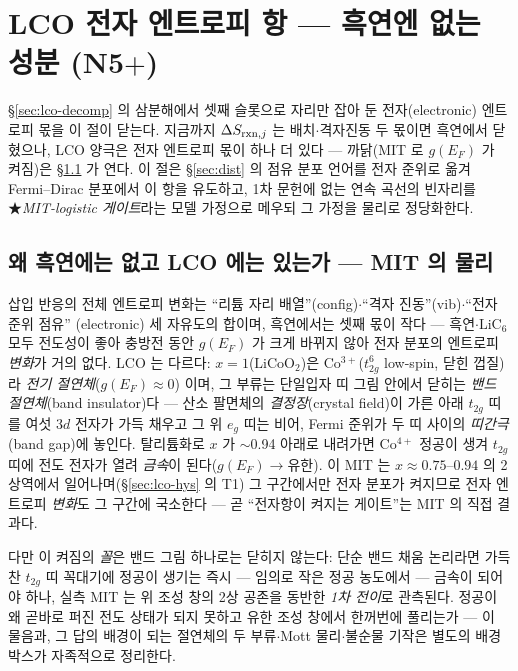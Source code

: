 \section{LCO 전자 엔트로피 항 --- 흑연엔 없는 성분 (N5$+$)}\label{sec:lco-electronic}
\S\ref{sec:lco-decomp} 의 삼분해에서 셋째 슬롯으로 자리만 잡아 둔 전자(electronic) 엔트로피 몫을 이 절이 닫는다.
지금까지 $\Delta S_{\mathrm{rxn},j}$ 는 배치$\cdot$격자진동 두 몫이면 흑연에서 닫혔으나, LCO 양극은 전자 엔트로피
몫이 하나 더 있다 --- 까닭(MIT 로 $g(E_F)$ 가 켜짐)은 \S\ref{sec:lco-why} 가 연다.
이 절은 \S\ref{sec:dist} 의 점유 분포 언어를 전자 준위로 옮겨 Fermi--Dirac 분포에서 이 항을 유도하고,
1차 문헌에 없는 연속 곡선의 빈자리를 ★\emph{MIT-logistic 게이트}라는 모델 가정으로 메우되 그 가정을 물리로
정당화한다.

\subsection{왜 흑연에는 없고 LCO 에는 있는가 --- MIT 의 물리}\label{sec:lco-why}
삽입 반응의 전체 엔트로피 변화는 ``리튬 자리 배열''(config)$\cdot$``격자 진동''(vib)$\cdot$``전자 준위 점유''
(electronic) 세 자유도의 합이며, 흑연에서는 셋째 몫이 작다 --- 흑연$\cdot$$\mathrm{LiC_6}$ 모두 전도성이 좋아
충방전 동안 $g(E_F)$ 가 크게 바뀌지 않아 전자 분포의 엔트로피 \emph{변화}가 거의 없다. LCO 는 다르다:
$x{=}1$($\mathrm{LiCoO_2}$)은 Co$^{3+}$($t_{2g}^6$ low-spin, 닫힌 껍질)라 \emph{전기 절연체}($g(E_F)\!\approx\!0$)
이며, 그 부류는 단일입자 띠 그림 안에서 닫히는 \emph{밴드 절연체}(band insulator)다 --- 산소 팔면체의
\emph{결정장}(crystal field)이 가른 아래 $t_{2g}$ 띠를 여섯 $3d$ 전자가 가득 채우고 그 위 $e_g$ 띠는 비어, Fermi 준위가 두 띠 사이의 \emph{띠간극}(band gap)에 놓인다.
탈리튬화로 $x$ 가 $\sim$0.94 아래로 내려가면 Co$^{4+}$ 정공이 생겨 $t_{2g}$ 띠에 전도 전자가 열려
\emph{금속}이 된다($g(E_F)\!\to\!$유한)\cite{menetrier1999,motohashi2009}. 이 MIT 는 $x\approx0.75$--$0.94$ 의
2상역에서 일어나며(\S\ref{sec:lco-hys} 의 T1) 그 구간에서만 전자 분포가 켜지므로 전자 엔트로피 \emph{변화}도
그 구간에 국소한다 --- 곧 ``전자항이 켜지는 게이트''는 MIT 의 직접 결과다.

다만 이 켜짐의 \emph{꼴}은 밴드 그림 하나로는 닫히지 않는다: 단순 밴드 채움 논리라면 가득 찬 $t_{2g}$ 띠
꼭대기에 정공이 생기는 즉시 --- 임의로 작은 정공 농도에서 --- 금속이 되어야 하나, 실측 MIT 는 위 조성 창의
2상 공존을 동반한 \emph{1차 전이}로 관측된다\cite{menetrier1999,reimers1992,motohashi2009}. 정공이 왜 곧바로
퍼진 전도 상태가 되지 못하고 유한 조성 창에서 한꺼번에 풀리는가 --- 이 물음과, 그 답의 배경이 되는 절연체의
두 부류$\cdot$Mott 물리$\cdot$불순물 기작은 별도의 배경 박스가 자족적으로 정리한다.

